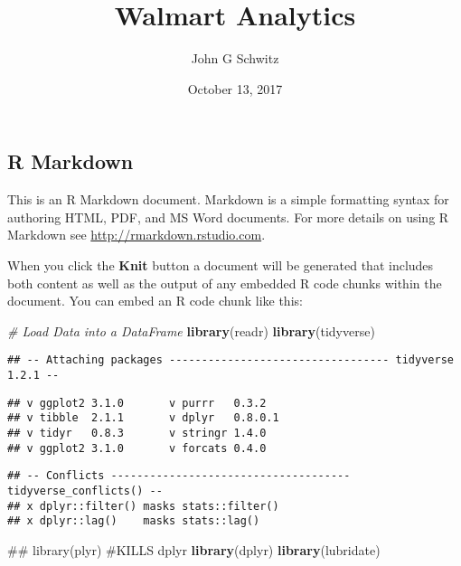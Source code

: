 \documentclass[]{article}
\title{Walmart Analytics}
\author{John G Schwitz}
\date{October 13, 2017}
\newenvironment{Shaded}{\begin{snugshade}}{\end{snugshade}}
\newcommand{\KeywordTok}[1]{\textcolor[rgb]{0.13,0.29,0.53}{\textbf{#1}}}
\newcommand{\CommentTok}[1]{\textcolor[rgb]{0.56,0.35,0.01}{\textit{#1}}}
\newcommand{\NormalTok}[1]{#1}
\begin{document}
\maketitle

\hypertarget{r-markdown}{%
\subsection{R Markdown}\label{r-markdown}}

This is an R Markdown document. Markdown is a simple formatting syntax
for authoring HTML, PDF, and MS Word documents. For more details on
using R Markdown see \url{http://rmarkdown.rstudio.com}.

When you click the \textbf{Knit} button a document will be generated
that includes both content as well as the output of any embedded R code
chunks within the document. You can embed an R code chunk like this:

\begin{Shaded}
\begin{Highlighting}[]
\CommentTok{# Load Data into a DataFrame}
\KeywordTok{library}\NormalTok{(readr)}
\KeywordTok{library}\NormalTok{(tidyverse)}
\end{Highlighting}
\end{Shaded}

\begin{verbatim}
## -- Attaching packages ---------------------------------- tidyverse 1.2.1 --
\end{verbatim}

\begin{verbatim}
## v ggplot2 3.1.0       v purrr   0.3.2  
## v tibble  2.1.1       v dplyr   0.8.0.1
## v tidyr   0.8.3       v stringr 1.4.0  
## v ggplot2 3.1.0       v forcats 0.4.0
\end{verbatim}

\begin{verbatim}
## -- Conflicts ------------------------------------- tidyverse_conflicts() --
## x dplyr::filter() masks stats::filter()
## x dplyr::lag()    masks stats::lag()
\end{verbatim}

\begin{Shaded}
\begin{Highlighting}[]
\NormalTok{## library(plyr) #KILLS dplyr}
\KeywordTok{library}\NormalTok{(dplyr)}
\KeywordTok{library}\NormalTok{(lubridate)}
\end{Highlighting}
\end{Shaded}
\end{document}
